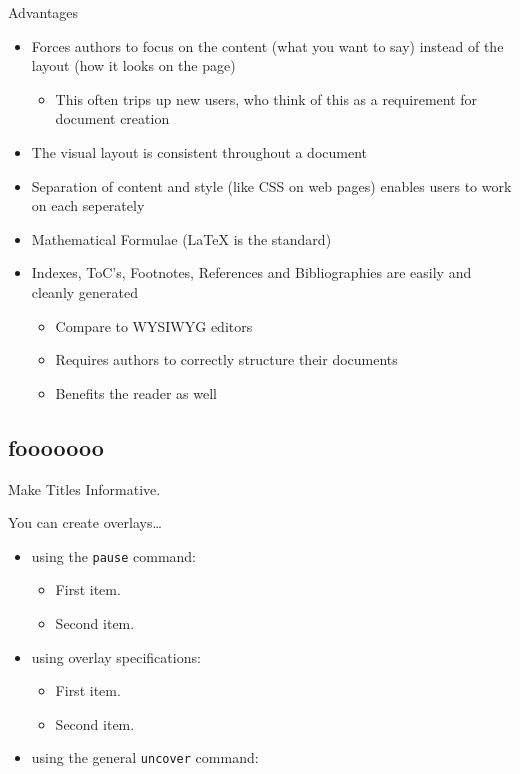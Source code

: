 \documentclass{beamer}
\begin{document}
\begin{frame}{Advantages}
  \begin{itemize}
  \item
    Forces authors to focus on the content (what you want to say)
      instead of the layout (how it looks on the page)
  \begin{itemize}
    \item
      This often trips up new users, who think of this as a
        requirement for document creation
  \end{itemize}
  \item
    The visual layout is consistent throughout a document
  \item
    Separation of content and style (like CSS on web pages)
    enables users to work on each seperately
  \item
    Mathematical Formulae (LaTeX is the standard)
  \item
    Indexes, ToC's, Footnotes, References and Bibliographies are
      easily and cleanly generated
  \begin{itemize}
    \item
      Compare to WYSIWYG editors
    \item
      Requires authors to correctly structure their documents
    \item
      Benefits the reader as well
  \end{itemize}
  \end{itemize}
\end{frame}

\subsection{fooooooo}

\begin{frame}{Make Titles Informative.}

  You can create overlays\dots
  \begin{itemize}
  \item using the \texttt{pause} command:
    \begin{itemize}
    \item
      First item.
      \pause
    \item    
      Second item.
    \end{itemize}
  \item
    using overlay specifications:
    \begin{itemize}
    \item<3->
      First item.
    \item<4->
      Second item.
    \end{itemize}
  \item
    using the general \texttt{uncover} command:
    \begin{itemize}
    \end{itemize}
  \end{itemize}
\end{frame}
\end{document}
